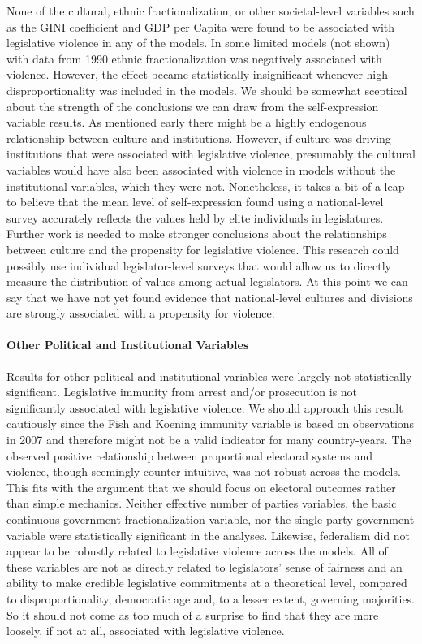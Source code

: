 \documentclass[a4paper]{article}\usepackage[]{graphicx}\usepackage[]{color}
\begin{document}
None of the cultural, ethnic fractionalization, or other societal-level variables such as the GINI coefficient and GDP per Capita were found to be associated with legislative violence in any of the models. In some limited models (not shown) with data from 1990 ethnic fractionalization was negatively associated with violence. However, the effect became statistically insignificant whenever high disproportionality was included in the models. We should be somewhat sceptical about the strength of the conclusions we can draw from the self-expression variable results. As mentioned early there might be a highly endogenous relationship between culture and institutions. However, if culture was driving institutions that were associated with legislative violence, presumably the cultural variables would have also been associated with violence in models without the institutional variables, which they were not. Nonetheless, it takes a bit of a leap to believe that the mean level of self-expression found using a national-level survey accurately reflects the values held by elite individuals in legislatures. Further work is needed to make stronger conclusions about the relationships between culture and the propensity for legislative violence. This research could possibly use individual legislator-level surveys that would allow us to directly measure the distribution of values among actual legislators. At this point we can say that we have not yet found evidence that national-level cultures and divisions are strongly associated with a propensity for violence.

\paragraph{Other Political and Institutional Variables}

Results for other political and institutional variables were largely not statistically significant. Legislative immunity from arrest and/or prosecution is not significantly associated with legislative violence. We should approach this result cautiously since the Fish and Koening immunity variable is based on observations in 2007 and therefore might not be a valid indicator for many country-years. The observed positive relationship between proportional electoral systems and violence, though seemingly counter-intuitive, was not robust across the models. This fits with the argument that we should focus on electoral outcomes rather than simple mechanics. Neither effective number of parties variables, the basic continuous government fractionalization variable, nor the single-party government variable were statistically significant in the analyses. Likewise, federalism did not appear to be robustly related to legislative violence across the models. All of these variables are not as directly related to legislators' sense of fairness and an ability to make credible legislative commitments at a theoretical level, compared to disproportionality, democratic age and, to a lesser extent, governing majorities. So it should not come as too much of a surprise to find that they are more loosely, if not at all, associated with legislative violence.
\end{document}
